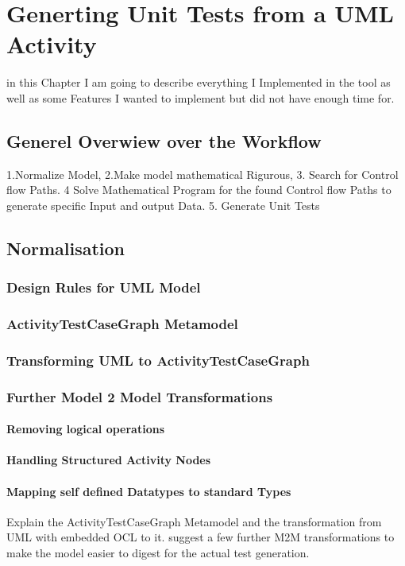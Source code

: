 \chapter{Generting Unit Tests from a UML Activity}
in this Chapter I am going to describe everything I Implemented in the tool as well as some Features I wanted to implement but did not have enough time for.
\section{Generel Overwiew over the Workflow}
1.Normalize Model, 2.Make model mathematical Rigurous, 3. Search for Control flow Paths. 4 Solve Mathematical Program for the found Control flow Paths to generate specific Input and output Data. 5. Generate Unit Tests
\section{Normalisation}
\subsection{Design Rules for UML Model}
\subsection{ActivityTestCaseGraph Metamodel}
\subsection{Transforming UML to ActivityTestCaseGraph}
\subsection{Further Model 2 Model Transformations}
\subsubsection{Removing logical operations}
\subsubsection{Handling Structured Activity Nodes}
\subsubsection{Mapping self defined Datatypes to standard Types}
Explain the ActivityTestCaseGraph Metamodel and the transformation from UML with embedded OCL to it. 
suggest a few further M2M transformations to make the model easier to digest for the actual test generation.
